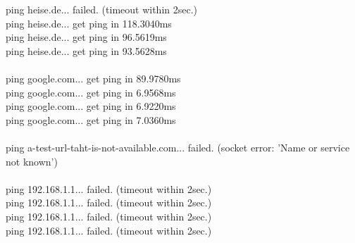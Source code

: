 \documentclass[11pt]{article}
\begin{document}
\noindent
ping heise.de... failed. (timeout within 2sec.)\\
ping heise.de... get ping in 118.3040ms\\
ping heise.de... get ping in 96.5619ms\\
ping heise.de... get ping in 93.5628ms\\\\
ping google.com... get ping in 89.9780ms\\
ping google.com... get ping in 6.9568ms\\
ping google.com... get ping in 6.9220ms\\
ping google.com... get ping in 7.0360ms\\\\
ping a-test-url-taht-is-not-available.com... failed. (socket error: 'Name or service not known')\\\\
ping 192.168.1.1... failed. (timeout within 2sec.)\\
ping 192.168.1.1... failed. (timeout within 2sec.)\\
ping 192.168.1.1... failed. (timeout within 2sec.)\\
ping 192.168.1.1... failed. (timeout within 2sec.)\\
\end{document}
